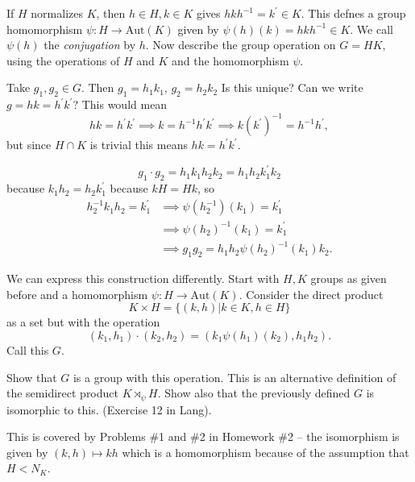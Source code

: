 If $H$ normalizes $K$, then
$h \in H, k \in K$ gives $h k h^{-1} = k^\prime \in K$. This defnes a
group homomorphism $\psi : H \to \mathrm{Aut}(K)$ given by
$\psi(h)(k) = h k h^{-1} \in K$. We call $\psi(h)$ the
\emph{conjugation} by $h$. Now describe the group operation on
$G = HK$, using the operations of $H$ and $K$ and the homomorphism $\psi$.

Take $g_1, g_2 \in G$. Then $g_1 = h_1 k_1$, $g_2 = h_2 k_2$ Is this
unique? Can we write $g = hk = h^\prime k^\prime$? This would mean
$$
hk = h^\prime k^\prime
  \implies k = h^{-1} h^\prime k^\prime
  \implies k (k^\prime)^{-1} = h^{-1} h^\prime,
$$
but since $H \cap K$ is trivial this means
$hk = h^\prime k^\prime$.

$$g_1 \cdot g_2 = h_1 k_1 h_2 k_2 = h_1 h_2 k_1^\prime k_2$$
because $k_1 h_2 = h_2 k_1^\prime$ because $kH = Hk$, so
\begin{align*}
h_2^{-1} k_1 h_2 = k_1^\prime
& \implies
  \psi(h_2^{-1})(k_1) = k_1^\prime \\
& \implies
  \psi(h_2)^{-1}(k_1) = k_1^\prime \\
& \implies g_1 g_2 = h_1 h_2 \psi(h_2)^{-1} (k_1) k_2.
\end{align*}


We can express this construction differently. Start with
$H, K$ groups as given before
and a homomorphism $\psi : H \to \mathrm{Aut}(K)$.
Consider the direct product
$$
K \times H = \{(k, h) | k \in K, h \in H \}
$$
as a set but with the operation
$$
(k_1, h_1) \cdot (k_2, h_2) = (k_1 \psi(h_1)(k_2), h_1 h_2).
$$
Call this $G$.

\begin{Problem}
Show that $G$ is a group with this operation. This is an alternative
definition of the semidirect product $K \rtimes_\psi H$. Show also
that the previously defined $G$ is isomorphic to this. (Exercise 12 in
Lang).
\end{Problem}

\begin{Answer}
This is covered by Problems \#1 and \#2 in Homework \#2
-- the isomorphism is given by $(k, h) \mapsto kh$
which is a homomorphism because of the assumption that $H < N_K$.
\end{Answer}

